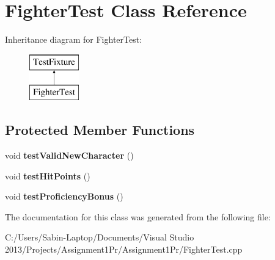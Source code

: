 \hypertarget{class_fighter_test}{}\section{Fighter\+Test Class Reference}
\label{class_fighter_test}
Inheritance diagram for Fighter\+Test\+:\begin{figure}[H]
\begin{center}
\leavevmode
\includegraphics[height=2.000000cm]{class_fighter_test}
\end{center}
\end{figure}
\subsection*{Protected Member Functions}
\begin{DoxyCompactItemize}
\item 
\hypertarget{class_fighter_test_af0641c84ec71e42b396280ec853cb093}{}\label{class_fighter_test_af0641c84ec71e42b396280ec853cb093} 
void {\bfseries test\+Valid\+New\+Character} ()
\item 
\hypertarget{class_fighter_test_a2e300a0bcf685fd8863b64c1ff003876}{}\label{class_fighter_test_a2e300a0bcf685fd8863b64c1ff003876} 
void {\bfseries test\+Hit\+Points} ()
\item 
\hypertarget{class_fighter_test_a3d0a319b2acbf2b30dfc8202e6a87e9e}{}\label{class_fighter_test_a3d0a319b2acbf2b30dfc8202e6a87e9e} 
void {\bfseries test\+Proficiency\+Bonus} ()
\end{DoxyCompactItemize}


The documentation for this class was generated from the following file\+:\begin{DoxyCompactItemize}
\item 
C\+:/\+Users/\+Sabin-\/\+Laptop/\+Documents/\+Visual Studio 2013/\+Projects/\+Assignment1\+Pr/\+Assignment1\+Pr/Fighter\+Test.\+cpp\end{DoxyCompactItemize}
